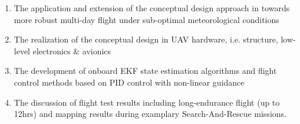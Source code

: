  \begin{enumerate}
\item The application and extension of the conceptual design approach in \cite{Noth_PhD,Leutenegger_JIRS} towards more robust multi-day flight under sub-optimal meteorological conditions
\item The realization of the conceptual design in UAV hardware, i.e. structure, low-level electronics \& avionics 
\item The development of onboard EKF state estimation algorithms and flight control methods based on PID control with non-linear guidance
\item The discussion of flight test results including long-endurance flight (up to 12hrs) and mapping results during examplary Search-And-Rescue missions.
\end{enumerate}

